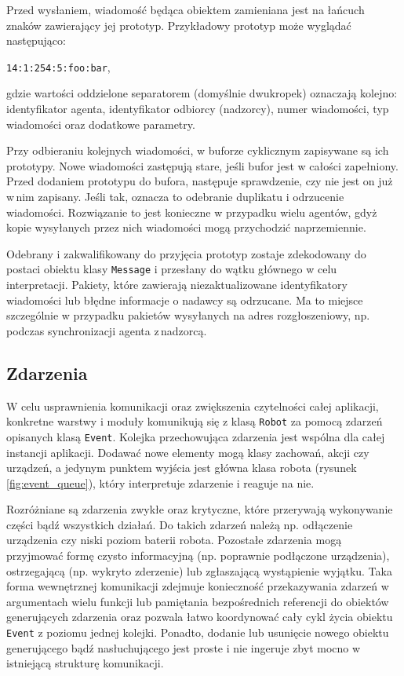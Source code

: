 Przed wysłaniem, wiadomość będąca obiektem zamieniana jest na łańcuch znaków zawierający jej prototyp. Przykładowy prototyp może wyglądać następująco:
\begin{center} {\tt 14:1:254:5:foo:bar},\\ \end{center}
gdzie wartości oddzielone separatorem (domyślnie dwukropek) oznaczają kolejno: identyfikator agenta, identyfikator odbiorcy (nadzorcy), numer wiadomości, typ\,wiadomości oraz dodatkowe parametry.

Przy odbieraniu kolejnych wiadomości, w buforze cyklicznym zapisywane są ich prototypy. Nowe wiadomości zastępują stare, jeśli bufor jest w całości zapełniony. Przed dodaniem prototypu do bufora, następuje sprawdzenie, czy nie jest on już w\,nim zapisany. Jeśli tak, oznacza to odebranie duplikatu i odrzucenie wiadomości. Rozwiązanie to jest konieczne w przypadku wielu agentów, gdyż kopie wysyłanych przez nich wiadomości mogą przychodzić naprzemiennie.

Odebrany i zakwalifikowany do przyjęcia prototyp zostaje zdekodowany do postaci obiektu klasy {\tt Message} i przesłany do wątku głównego w celu interpretacji. Pakiety, które zawierają niezaktualizowane identyfikatory wiadomości lub błędne informacje o nadawcy są odrzucane. Ma to miejsce szczególnie w przypadku pakietów wysyłanych na adres rozgłoszeniowy, np. podczas synchronizacji agenta z\,nadzorcą.

\subsection{Zdarzenia}

W celu usprawnienia komunikacji oraz zwiększenia czytelności całej aplikacji, konkretne warstwy i moduły komunikują się z klasą {\tt Robot} za pomocą zdarzeń opisanych klasą {\tt Event}. Kolejka przechowująca zdarzenia jest wspólna dla całej instancji aplikacji. Dodawać nowe elementy mogą klasy zachowań, akcji czy urządzeń, a jedynym punktem wyjścia jest główna klasa robota (rysunek \ref{fig:event_queue}), który interpretuje zdarzenie i reaguje na nie.

Rozróżniane są zdarzenia zwykłe oraz krytyczne, które przerywają wykonywanie części bądź wszystkich działań. Do takich zdarzeń należą np. odłączenie urządzenia czy niski poziom baterii robota. Pozostałe zdarzenia mogą przyjmować formę czysto informacyjną (np. poprawnie podłączone urządzenia), ostrzegającą (np. wykryto zderzenie) lub zgłaszającą wystąpienie wyjątku. Taka forma wewnętrznej komunikacji zdejmuje konieczność przekazywania zdarzeń w argumentach wielu funkcji lub pamiętania bezpośrednich referencji do obiektów generujących zdarzenia oraz pozwala łatwo koordynować cały cykl życia obiektu {\tt Event} z poziomu jednej kolejki. Ponadto, dodanie lub usunięcie nowego obiektu generującego bądź nasłuchującego jest proste i nie ingeruje zbyt mocno w istniejącą strukturę komunikacji.

